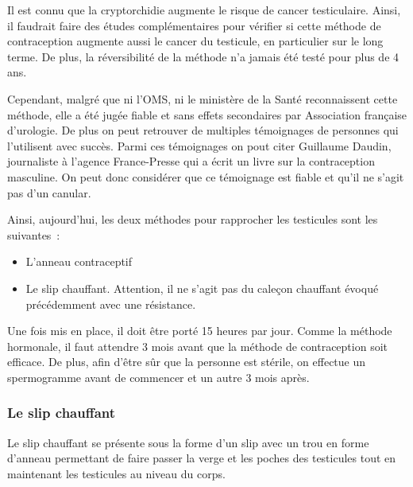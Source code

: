 \documentclass[12pt,a4paper]{report}
\begin{document}
Il est connu que la cryptorchidie augmente le risque de cancer testiculaire. \cite{CryptorchidieOuTesticule}
Ainsi, il faudrait faire des études complémentaires pour vérifier si cette méthode de contraception augmente aussi le cancer du testicule, en particulier sur le long terme. De plus, la réversibilité de la méthode n'a jamais été testé pour plus de 4 ans. \cite{NoticeUtilisationPdf2022}

Cependant, malgré que ni l'OMS, ni le ministère de la Santé reconnaissent cette méthode, elle a été jugée fiable et sans effets secondaires par Association française d'urologie.\cite{ContraceptionMasculineAucune2021}
De plus on peut retrouver de multiples témoignages de personnes qui l'utilisent avec succès.
Parmi ces témoignages on pout citer Guillaume Daudin, journaliste à l'agence France-Presse qui a écrit un livre sur la contraception masculine. \cite{guillaumedaudinContraceptesEnqueteDernier2022}
On peut donc considérer que ce témoignage est fiable et qu'il ne s'agit pas d'un canular.

Ainsi, aujourd'hui, les deux méthodes pour rapprocher les testicules sont les suivantes :
\begin{itemize}
    \item L'anneau contraceptif
    \item Le slip chauffant. Attention, il ne s'agit pas du caleçon chauffant évoqué précédemment avec une résistance.
\end{itemize}

Une fois mis en place, il doit être porté 15 heures par jour. Comme la méthode hormonale, il faut attendre 3 mois avant que la méthode de contraception soit efficace. \cite{anne-sophiedelcourHommeSousPilule}
De plus, afin d'être sûr que la personne est stérile, on effectue un spermogramme avant de commencer et un autre 3 mois après. \cite{MethodeThermique}

\subsubsection{Le slip chauffant}

Le slip chauffant se présente sous la forme d'un slip avec un trou en forme d'anneau permettant de faire passer la verge et les poches des testicules tout en maintenant les testicules au niveau du corps. \cite{MethodeThermique}
\end{document}
